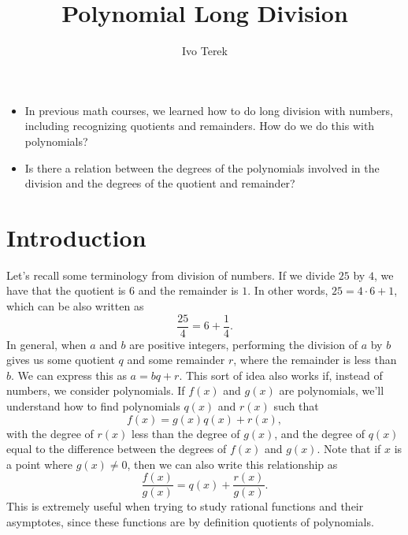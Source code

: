 \documentclass{ximera}
\author{Ivo Terek}
\title{Polynomial Long Division}
\begin{document}
\begin{abstract}
\end{abstract}
\maketitle


\begin{motivatingQuestions}\begin{itemize}
\item In previous math courses, we learned how to do long division with numbers, including recognizing quotients and remainders. How do we do this with polynomials?
\item Is there a relation between the degrees of the polynomials involved in the division and the degrees of the quotient and remainder?
\end{itemize}\end{motivatingQuestions}



\section{Introduction}

Let's recall some terminology from division of numbers. If we divide $25$ by $4$, we have that the quotient is $6$ and the remainder is $1$. In other words, $25 = 4\cdot 6 + 1$, which can be also written as $$  \frac{25}{4} = 6+\frac{1}{4}. $$In general, when $a$ and $b$ are positive integers, performing the division of $a$ by $b$ gives us some quotient $q$ and some remainder $r$, where the remainder is less than $b$. We can express this as $a = bq+r$. This sort of idea also works if, instead of numbers, we consider polynomials. If $f(x)$ and $g(x)$ are polynomials, we'll understand how to find polynomials $q(x)$ and $r(x)$ such that $$  f(x) = g(x)q(x)+r(x),  $$with the degree of $r(x)$ less than the degree of $g(x)$, and the degree of $q(x)$ equal to the difference between the degrees of $f(x)$ and $g(x)$. Note that if $x$ is a point where $g(x) \not= 0$, then we can also write this relationship as
$$
  \frac{f(x)}{g(x)} = q(x) + \frac{r(x)}{g(x)}.
$$ This is extremely useful when trying to study rational functions and their asymptotes, since these functions are by definition quotients of polynomials. 
\end{document}
